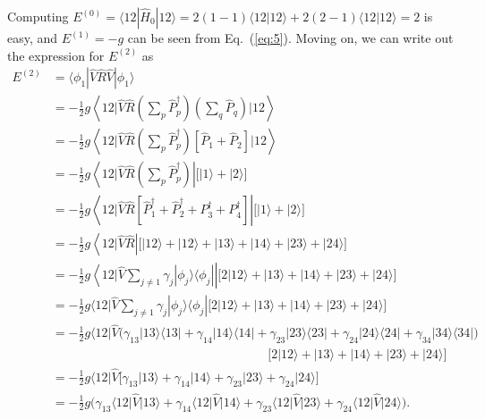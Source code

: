 \documentclass[a4paper]{article}
\newcommand{\eq} [1]{Eq.\ (\ref{eq:#1})}
\newcommand{\nn}{\nonumber}
\begin{document}
Computing $E^{(0)}=\langle 12 | \hat H_0 | 12\rangle=2(1-1)\langle12|12\rangle+2(2-1)\langle12|12\rangle=2$ is easy, and $E^{(1)}=-g$ can be seen from \eq{5}. Moving on, we can write out the expression for $E^{(2)}$ as
\begin{align}
E^{(2)} &= \langle \phi_1 |\hat V \hat R \hat V |\phi_1\rangle \nn\\
%
&= -\frac{1}{2}g\left\langle 12 \Bigg| \hat V \hat R \left(\sum_p \hat P^\dagger_p \right)\left( \sum_q \hat P_q \right) \Bigg| 12\right\rangle \nn\\
%
&= -\frac{1}{2}g\left\langle 12 \Bigg| \hat V \hat R \left(\sum_p \hat P^\dagger_p \right) \left[  \hat P_1 + \hat P_2  \right]  \Bigg| 12\right\rangle  \nn\\
%
&= -\frac{1}{2}g\left\langle 12 \Bigg| \hat V \hat R \left(\sum_p \hat P^\dagger_p \right)   \right| \Big[ \big|1\big\rangle + \big|2\big\rangle\Big] \nn\\
%
&= -\frac{1}{2}g\left\langle 12 \Bigg| \hat V \hat R \left[  \hat P^\dagger_1 + \hat P^\dagger_2 + P^\dagger_3 + P^\dagger_4  \right]   \right| \Big[ \big|1\big\rangle + \big|2\big\rangle\Big] \nn\\
%
&= -\frac{1}{2}g\left\langle 12 \Big| \hat V \hat R \right| \Big[ \big|12\big\rangle + \big|12\big\rangle + \big|13\big\rangle + \big|14\big\rangle + \big|23\big\rangle + \big|24\big\rangle\Big] \nn\\
%
&= -\frac{1}{2}g\left\langle 12 \Big| \hat V \sum_{j\not=1}\gamma_j |\phi_j\rangle\langle \phi_j| \right| \Big[ 2\big|12\big\rangle + \big|13\big\rangle + \big|14\big\rangle + \big|23\big\rangle + \big|24\big\rangle\Big] \nn\\
%
&= -\frac{1}{2}g\Big\langle 12 \Big| \hat V \sum_{j\not=1}\gamma_j |\phi_j\rangle\langle \phi_j|  \Big[ 2\big|12\big\rangle + \big|13\big\rangle + \big|14\big\rangle + \big|23\big\rangle + \big|24\big\rangle\Big] \nn\\
%
&= -\frac{1}{2}g\Big\langle 12 \Big| \hat V \Big(\gamma_{13} |13\rangle\langle 13| + \gamma_{14} |14\rangle\langle 14| + \gamma_{23} |23\rangle\langle 23| + \gamma_{24} |24\rangle\langle 24| + \gamma_{34} |34\rangle\langle 34| \Big) \nn\\ 
& \ \ \ \ \ \ \ \ \ \ \ \ \ \ \ \ \ \ \ \ \ \ \ \ \ \ \ \ \ \ \ \ \ \ \ \ \ \ \ \ \ \ \ \ \ \ \ \ \ \ \ \ \ \ \ \ \ \ \ \ \ \ \ \ \ \ \ \ \ \ \ \ \ \ \ \ \ \ \Big[ 2\big|12\big\rangle + \big|13\big\rangle + \big|14\big\rangle + \big|23\big\rangle + \big|24\big\rangle\Big] \nn\\
%
&= -\frac{1}{2}g\Big\langle 12 \Big| \hat V \Big[ \gamma_{13}\big|13\big\rangle + \gamma_{14}\big|14\big\rangle + \gamma_{23}\big|23\big\rangle + \gamma_{24}\big|24\big\rangle\Big] \nn\\
%
&= -\frac{1}{2}g\Big( \gamma_{13}\big\langle12\big|\hat V\big|13\big\rangle + \gamma_{14}\big\langle12\big|\hat V\big|14\big\rangle + \gamma_{23}\big\langle12\big|\hat V\big|23\big\rangle + \gamma_{24}\big\langle12\big|\hat V\big|24\big\rangle\Big).
\end{align}
\end{document}
